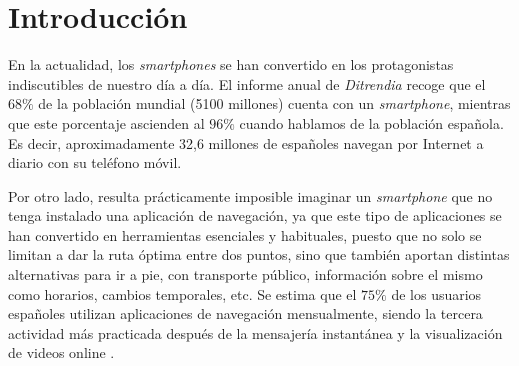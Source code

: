\chapter{Introducción}
\label{cap:introduccion}




	

En la actualidad, los \textit{smartphones} se han convertido en los protagonistas indiscutibles de nuestro día a día. El informe anual de \textit{Ditrendia} \citep{ditrendia2019informe} recoge que el $68\%$ de la población mundial (5100 millones) cuenta con un \textit{smartphone}, mientras que este porcentaje ascienden al $96\%$ cuando hablamos de la población española. Es decir, aproximadamente 32,6 millones de españoles navegan por Internet a diario con su teléfono móvil. 

Por otro lado, resulta prácticamente imposible imaginar un \textit{smartphone} que no tenga instalado una aplicación de navegación, ya que este tipo de aplicaciones se han convertido en herramientas esenciales y habituales, puesto que no solo se limitan a dar la ruta óptima entre dos puntos, sino que también aportan distintas alternativas para ir a pie, con transporte público, información sobre el mismo como horarios, cambios temporales, etc. Se estima que el $75\%$ de los usuarios españoles utilizan aplicaciones de navegación mensualmente, siendo la tercera actividad más practicada después de la mensajería instantánea y la visualización de videos online \citep{ditrendia2019informe}.

